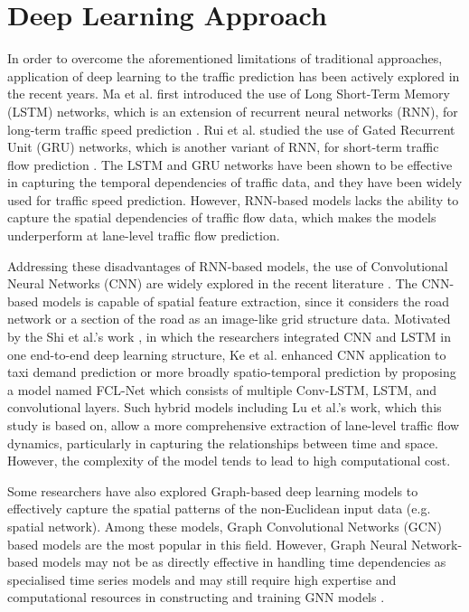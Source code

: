 \documentclass[11pt]{uonthesis}
\begin{document}
\section{Deep Learning Approach}

In order to overcome the aforementioned limitations of traditional approaches, application of deep learning to the traffic prediction has been actively explored in the recent years. Ma et al. first introduced the use of Long Short-Term Memory (LSTM) networks, which is an extension of recurrent neural networks (RNN), for long-term traffic speed prediction \cite{ma2015lstm}. Rui et al. studied the use of Gated Recurrent Unit (GRU) networks, which is another variant of RNN, for short-term traffic flow prediction \cite{rui2017gru}. The LSTM and GRU networks have been shown to be effective in capturing the temporal dependencies of traffic data, and they have been widely used for traffic speed prediction. However, RNN-based models lacks the ability to capture the spatial dependencies of traffic flow data, which makes the models underperform at lane-level traffic flow prediction. 

Addressing these disadvantages of RNN-based models, the use of Convolutional Neural Networks (CNN) are widely explored in the recent literature \cite{macnnimage}\cite{cnnzhang}. The CNN-based models is capable of spatial feature extraction, since it considers the road network or a section of the road as an image-like grid structure data. Motivated by the Shi et al.'s work \cite{convlstm}, in which the researchers integrated CNN and LSTM in one end-to-end deep learning structure, Ke et al. \cite{FCL} enhanced CNN application to taxi demand prediction or more broadly spatio-temporal prediction by proposing a model named FCL-Net which consists of multiple Conv-LSTM, LSTM, and convolutional layers. Such hybrid models including Lu et al.'s work, which this study is based on, allow a more comprehensive extraction of lane-level traffic flow dynamics, particularly in capturing the relationships between time and space. However, the complexity of the model tends to lead to high computational cost.

Some researchers have also explored Graph-based deep learning models to effectively capture the spatial patterns of the non-Euclidean input data (e.g. spatial network). Among these models, Graph Convolutional Networks (GCN) based models \cite{gcn1}\cite{gcn2}\cite{agafonov} are the most popular in this field. However, Graph Neural Network-based models may not be as directly effective in handling time dependencies as specialised time series models and may still require high expertise and computational resources in constructing and training GNN models \cite{li2024unifyinglaneleveltrafficprediction}.  
\end{document}
